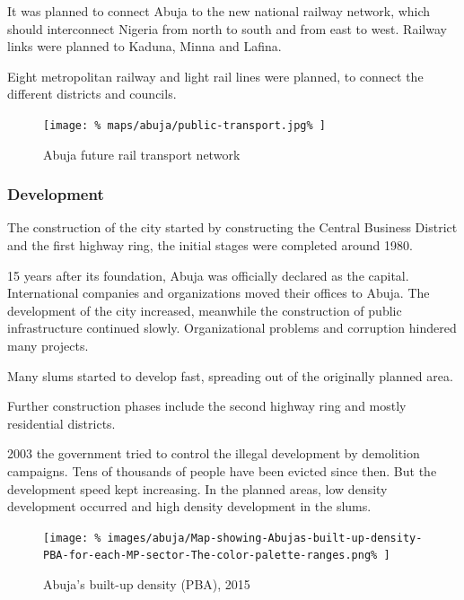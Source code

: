 \documentclass{article}
\begin{document}
\begin{multicols}{2}
			It was planned to connect Abuja to the new national railway network, which should interconnect Nigeria from north to south and from east to west.
			Railway links were planned to Kaduna, Minna and Lafina.
			
			Eight metropolitan railway and light rail lines were planned, to connect the different districts and councils. 
			
			\begin{figure}[H]
				\texttt{[image: \%
					maps/abuja/public-transport.jpg\%
				]}
				\caption{Abuja future rail transport network  \cite{ASplusP:AbujaTransportationConcept}}
				\label{fig:map:abuja-future-rail-network}
			\end{figure}	
			
			
			\subsubsection{Development}
			
			The construction of the city started by constructing the Central Business District and the first highway ring, the initial stages were completed around 1980.
			
			15 years after its foundation, Abuja was officially declared as the capital. International companies and organizations moved their offices to Abuja.
			The development of the city increased, meanwhile the construction of public infrastructure continued slowly. Organizational problems and corruption hindered many projects.
			
			Many slums started to develop fast, spreading out of the originally planned area.

			
			
			Further construction phases include the second highway ring and mostly residential districts.
			
			2003 the government tried to control the illegal development by demolition campaigns. Tens of thousands of people have been evicted since then. But the development speed kept increasing. In the planned areas, low density development occurred and high density development in the slums.
			
			\begin{figure}[H]
				\texttt{[image: \%
					images/abuja/Map-showing-Abujas-built-up-density-PBA-for-each-MP-sector-The-color-palette-ranges.png\%
				]}
				\caption{Abuja's built-up density (PBA), 2015  \cite{ResearchGate:AbujaDensity}}
				\label{fig:images:abuja-density}
			\end{figure}
			

\end{multicols}
\end{document}
